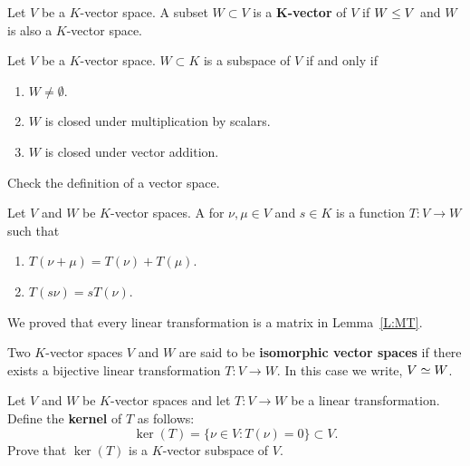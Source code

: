 \documentclass{ximera}
\begin{document}
\begin{definition}
  Let $V$ be a $K$-vector space. A subset $W\subset V$ is a
  \textbf{$\boldsymbol K$-vector}  of $V$ if $W\leq V$ and $W$
  is also a $K$-vector space.
\end{definition}

\begin{lemma}
  Let $V$ be a $K$-vector space. $W\subset K$ is a subspace of $V$ if
  and only if
  \begin{enumerate}
  \item $W\ne \emptyset$.
  \item $W$ is closed under multiplication by scalars.
  \item $W$ is closed under vector addition.
  \end{enumerate}
  \begin{sketch}
    Check the definition of a vector space.
  \end{sketch}
\end{lemma}

\begin{definition}
  Let $V$ and $W$ be $K$-vector spaces. A 
  for $\nu,\mu\in V$ and $s\in K$ is a function $T:V\to W$ such that
    \begin{enumerate}
    \item $T(\nu+\mu) = T(\nu)+T(\mu)$.
    \item $T(s \nu) = sT(\nu)$.
    \end{enumerate}
\end{definition}

\begin{remark}
  We proved that every linear transformation is a matrix in
  Lemma~\ref{L:MT}.
\end{remark}

\begin{definition}
  Two $K$-vector spaces $V$ and $W$ are said to be \textbf{isomorphic
    vector spaces} if there exists a bijective linear transformation
  $T:V\to W$. In this case we write, $V\simeq W$.
\end{definition}

\begin{exercise}
  Let $V$ and $W$ be $K$-vector spaces and let $T:V\to W$ be a linear
  transformation. Define the \textbf{kernel} of $T$ as follows:
  \[
  \ker(T) = \{\nu\in V: T(\nu) = 0\}\subset V.
  \]
  Prove that $\ker(T)$ is a $K$-vector subspace of $V$.
\end{exercise}
\end{document}
